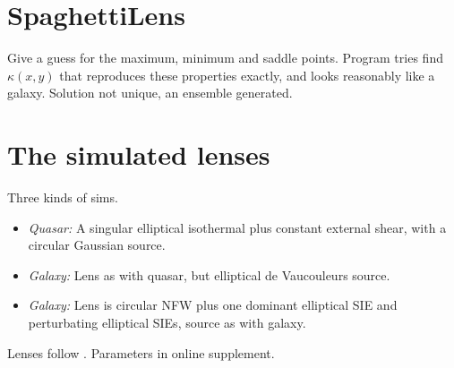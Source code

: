\section{SpaghettiLens} \label{sec:SpaghettiLens}

Give a guess for the maximum, minimum and saddle points.  Program
tries find $\kappa(x,y)$ that reproduces these properties exactly, and
looks reasonably like a galaxy.  Solution not unique, an ensemble
generated.

\section{The simulated lenses} \label{sec:sims}

Three kinds of sims.

\begin{itemize}
\item {\em Quasar:\/} A singular elliptical isothermal plus constant
  external shear, with a circular Gaussian source.
\item {\em Galaxy:\/} Lens as with quasar, but elliptical de
  Vaucouleurs source.
\item {\em Galaxy:\/} Lens is circular NFW plus one dominant
  elliptical SIE and perturbating elliptical SIEs, source as with
  galaxy.
\end{itemize}
Lenses follow \cite{2001astro.ph..2341K,2001astro.ph..2340K}.
Parameters in online supplement.